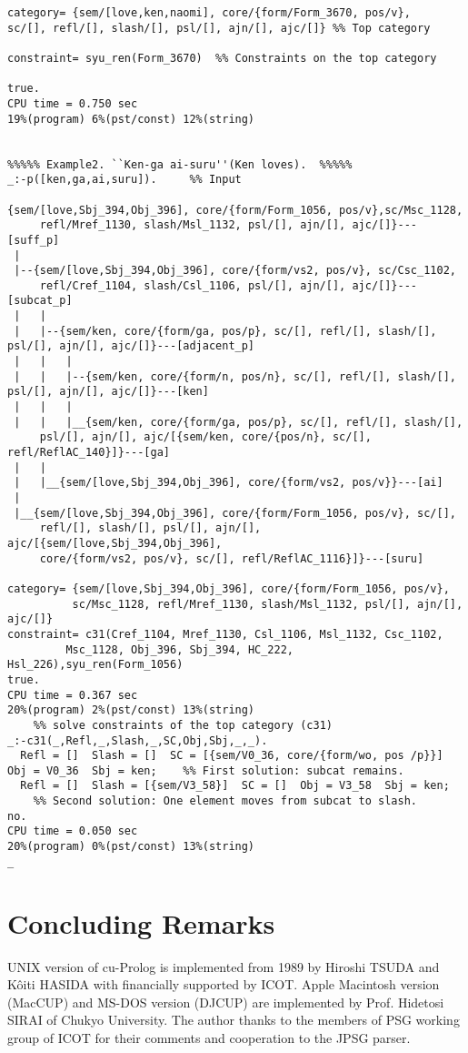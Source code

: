 {\begin{verbatim}
category= {sem/[love,ken,naomi], core/{form/Form_3670, pos/v},
sc/[], refl/[], slash/[], psl/[], ajn/[], ajc/[]} %% Top category

constraint= syu_ren(Form_3670)	%% Constraints on the top category

true.
CPU time = 0.750 sec
19%(program) 6%(pst/const) 12%(string)


%%%%% Example2. ``Ken-ga ai-suru''(Ken loves).	%%%%%
_:-p([ken,ga,ai,suru]).		%% Input

{sem/[love,Sbj_394,Obj_396], core/{form/Form_1056, pos/v},sc/Msc_1128,
     refl/Mref_1130, slash/Msl_1132, psl/[], ajn/[], ajc/[]}---[suff_p]
 | 
 |--{sem/[love,Sbj_394,Obj_396], core/{form/vs2, pos/v}, sc/Csc_1102,
     refl/Cref_1104, slash/Csl_1106, psl/[], ajn/[], ajc/[]}---[subcat_p]
 |   | 
 |   |--{sem/ken, core/{form/ga, pos/p}, sc/[], refl/[], slash/[], psl/[], ajn/[], ajc/[]}---[adjacent_p]
 |   |   | 
 |   |   |--{sem/ken, core/{form/n, pos/n}, sc/[], refl/[], slash/[], psl/[], ajn/[], ajc/[]}---[ken]
 |   |   | 
 |   |   |__{sem/ken, core/{form/ga, pos/p}, sc/[], refl/[], slash/[],
     psl/[], ajn/[], ajc/[{sem/ken, core/{pos/n}, sc/[], refl/ReflAC_140}]}---[ga]
 |   | 
 |   |__{sem/[love,Sbj_394,Obj_396], core/{form/vs2, pos/v}}---[ai]
 | 
 |__{sem/[love,Sbj_394,Obj_396], core/{form/Form_1056, pos/v}, sc/[],
     refl/[], slash/[], psl/[], ajn/[], ajc/[{sem/[love,Sbj_394,Obj_396],
     core/{form/vs2, pos/v}, sc/[], refl/ReflAC_1116}]}---[suru]

category= {sem/[love,Sbj_394,Obj_396], core/{form/Form_1056, pos/v},
          sc/Msc_1128, refl/Mref_1130, slash/Msl_1132, psl/[], ajn/[], ajc/[]}
constraint= c31(Cref_1104, Mref_1130, Csl_1106, Msl_1132, Csc_1102,
         Msc_1128, Obj_396, Sbj_394, HC_222, Hsl_226),syu_ren(Form_1056)
true.
CPU time = 0.367 sec
20%(program) 2%(pst/const) 13%(string)
	%% solve constraints of the top category (c31)
_:-c31(_,Refl,_,Slash,_,SC,Obj,Sbj,_,_).
  Refl = []  Slash = []  SC = [{sem/V0_36, core/{form/wo, pos /p}}]  
Obj = V0_36  Sbj = ken;    %% First solution: subcat remains.
  Refl = []  Slash = [{sem/V3_58}]  SC = []  Obj = V3_58  Sbj = ken;
	%% Second solution: One element moves from subcat to slash.
no.
CPU time = 0.050 sec
20%(program) 0%(pst/const) 13%(string)
_\end{verbatim}
}

\normalskip

\section{Concluding Remarks}
UNIX version of cu-Prolog is implemented from 1989 by Hiroshi TSUDA and
K\^{o}iti HASIDA with financially supported by ICOT.
Apple Macintosh version (MacCUP) and MS-DOS version (DJCUP) are
implemented by Prof. Hidetosi SIRAI of Chukyo University.
The author thanks to the members of PSG working group of ICOT for
their comments and cooperation to the JPSG parser.

